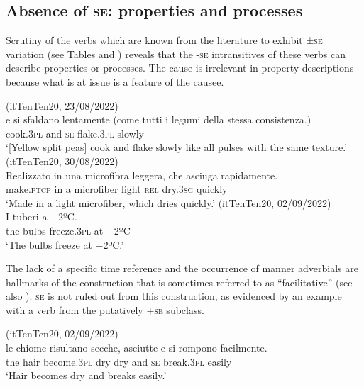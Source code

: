 \documentclass[output=paper,colorlinks,citecolor=brown
]{langscibook}
\begin{document}
\subsection{Absence of \textsc{se}: properties and processes}
\label{bentley_section_4.1}
Scrutiny of the verbs which are known from the literature to exhibit ±\textsc{se} variation (see Tables  and ) reveals that the -\textsc{se} intransitives of these verbs can describe properties or processes. The cause is irrelevant in property descriptions because what is at issue is a feature of the causee. 

\ea \label{bentley_example_20}(itTenTen20, 23/08/2022)\\
    \gll {} e			si		sfaldano		lentamente (come tutti i legumi della stessa consistenza.)\\
    cook.3\textsc{pl}		and	\textsc{se}		flake.3\textsc{pl}		slowly {}\\
    \glt ‘[Yellow split peas] cook and flake slowly like all pulses with the same texture.’
\ex \label{bentley_example_21}(itTenTen20, 30/08/2022)\\
    \gll Realizzato	in una microfibra		leggera,	che			asciuga		rapidamente. \\
    make.\textsc{ptcp}	in	a				microfiber		light				\textsc{rel}		dry.3\textsc{sg}		quickly \\
    \glt ‘Made in a light microfiber, which dries quickly.’
\ex \label{bentley_example_22}(itTenTen20, 02/09/2022)\\
    \gll I tuberi  a −2ºC.\\
    	the		bulbs		freeze.3\textsc{pl}		at		−2ºC \\
    \glt ‘The bulbs freeze at −2ºC.’
\z


The lack of a specific time reference and the occurrence of manner adverbials are hallmarks of the construction that is sometimes referred to as “facilitative” \citep[147--149]{kemmer1993middle} (see also \cite[25--26]{levin1993english}). \textsc{se} is not ruled out from this construction, as evidenced by an example with a verb from the putatively +\textsc{se} subclass.

\ea \label{bentley_example_23}(itTenTen20, 02/09/2022)\\
    \gll  {\ldots}  le		chiome risultano				secche,	asciutte e				si 		rompono facilmente.\\
    {} the	hair				become.3\textsc{pl}	dry					dry					and	\textsc{se}		break.3\textsc{pl}	easily \\
    \glt ‘Hair becomes dry and breaks easily.’ 
\z
\end{document}
